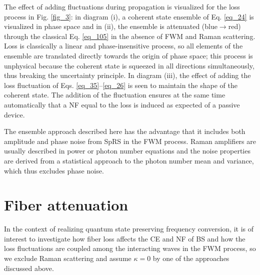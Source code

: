 \documentclass[10pt,letterpaper]{article}
\begin{document}
\noindent The effect of adding fluctuations during propagation is visualized for the loss process in Fig. \ref{fig_3}: in diagram (i), a coherent state ensemble of Eq. \eqref{eq_24} is visualized in phase space and in (ii), the ensemble is attenuated (blue$\rightarrow$red) through the classical Eq. \eqref{eq_105} in the absence of FWM and Raman scattering. Loss is classically a linear and phase-insensitive process, so all elements of the ensemble are translated directly towards the origin of phase space; this process is unphysical because the coherent state is squeezed in all directions simultaneously, thus breaking the uncertainty principle. In diagram (iii), the effect of adding the loss fluctuation of Eqs. \eqref{eq_35}--\eqref{eq_26} is seen to maintain the shape of the coherent state. The addition of the fluctuation ensures at the same time automatically that a NF equal to the loss is induced as expected of a passive device.

The ensemble approach described here has the advantage that it includes both amplitude and phase noise from SpRS in the FWM process. Raman amplifiers are usually described in power or photon number equations and the noise properties are derived from a statistical approach to the photon number mean and variance, which thus excludes phase noise. 


%
%
%
%
\section{Fiber attenuation}
In the context of realizing quantum state preserving frequency conversion, it is of interest to investigate how fiber loss affects the CE and NF of BS and how the loss fluctuations are coupled among the interacting waves in the FWM process, so we exclude Raman scattering and assume $\kappa = 0$ by one of the approaches discussed above.
\end{document}
